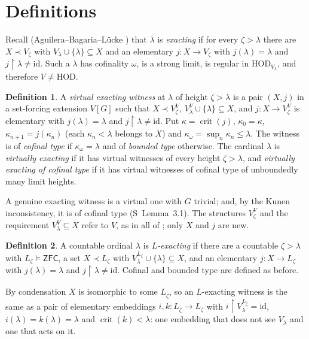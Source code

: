 \documentclass[11pt,letterpaper]{article}
\theoremstyle{definition}
\newtheorem{definition}{Definition}[section]
\numberwithin{equation}{section}
\newcommand{\ZFC}{\mathsf{ZFC}}
\newcommand{\HOD}{\mathrm{HOD}}
\newcommand{\crit}{\operatorname{crit}}
\newcommand{\restr}{\mathbin{\upharpoonright}}
\begin{document}
\section{Definitions}

Recall (Aguilera--Bagaria--L\"ucke \cite{abl}) that $\lambda$ is \emph{exacting} if for every $\zeta>\lambda$ there are $X\prec V_\zeta$ with $V_\lambda\cup\{\lambda\}\subseteq X$ and an elementary $j:X\to V_\zeta$ with $j(\lambda)=\lambda$ and $j\restr\lambda\ne\mathrm{id}$. Such a $\lambda$ has cofinality $\omega$, is a strong limit, is regular in $\HOD_{V_\lambda}$, and therefore $V\ne\HOD$.

\begin{definition}\label{def:virtual}
A \emph{virtual exacting witness} at $\lambda$ of height $\zeta>\lambda$ is a pair $(X,j)$ in a set-forcing extension $V[G]$ such that $X\prec V^V_\zeta$, $V^V_\lambda\cup\{\lambda\}\subseteq X$, and $j:X\to V^V_\zeta$ is elementary with $j(\lambda)=\lambda$ and $j\restr\lambda\ne\mathrm{id}$. Put $\kappa=\crit(j)$, $\kappa_0=\kappa$, $\kappa_{n+1}=j(\kappa_n)$ (each $\kappa_n<\lambda$ belongs to $X$) and $\kappa_\omega=\sup_n\kappa_n\le\lambda$. The witness is of \emph{cofinal type} if $\kappa_\omega=\lambda$ and of \emph{bounded type} otherwise. The cardinal $\lambda$ is \emph{virtually exacting} if it has virtual witnesses of every height $\zeta>\lambda$, and \emph{virtually exacting of cofinal type} if it has virtual witnesses of cofinal type of unboundedly many limit heights.
\end{definition}

A genuine exacting witness is a virtual one with $G$ trivial; and, by the Kunen inconsistency, it is of cofinal type (S~Lemma~3.1). The structures $V^V_\zeta$ and the requirement $V^V_\lambda\subseteq X$ refer to $V$, as in all of \cite{gs}; only $X$ and $j$ are new.

\begin{definition}\label{def:Lex}
A countable ordinal $\lambda$ is \emph{$L$-exacting} if there are a countable $\zeta>\lambda$ with $L_\zeta\models\ZFC$, a set $X\prec L_\zeta$ with $V^{L_\zeta}_\lambda\cup\{\lambda\}\subseteq X$, and an elementary $j:X\to L_\zeta$ with $j(\lambda)=\lambda$ and $j\restr\lambda\ne\mathrm{id}$. Cofinal and bounded type are defined as before.
\end{definition}

By condensation $X$ is isomorphic to some $L_{\bar\zeta}$, so an $L$-exacting witness is the same as a pair of elementary embeddings $i,k:L_{\bar\zeta}\to L_\zeta$ with $i\restr V^{L_{\bar\zeta}}_\lambda=\mathrm{id}$, $i(\lambda)=k(\lambda)=\lambda$ and $\crit(k)<\lambda$: one embedding that does not see $V_\lambda$ and one that acts on it.
\end{document}
